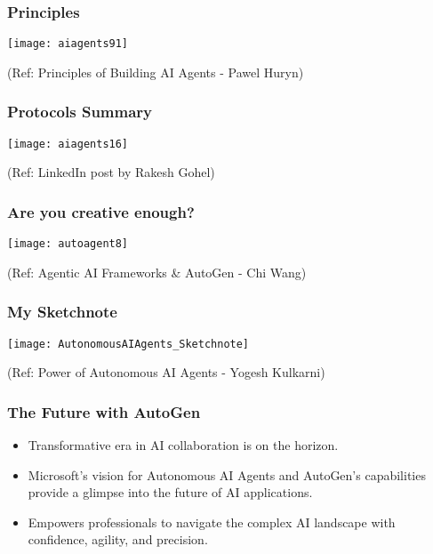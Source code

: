 \begin{frame}[fragile]\frametitle{Principles}
		\begin{center}
		\texttt{[image: aiagents91]}
		
		{\tiny (Ref: Principles of Building AI Agents - Pawel Huryn)}
		\end{center}
\end{frame}

\begin{frame}[fragile]\frametitle{Protocols Summary}
		\begin{center}
		\texttt{[image: aiagents16]}
		\end{center}
		
		{\tiny (Ref: LinkedIn post by Rakesh Gohel)}
\end{frame}
  

\begin{frame}[fragile]\frametitle{Are you creative enough?}
		\begin{center}
		\texttt{[image: autoagent8]}
		\end{center}
		
		{\tiny (Ref: Agentic AI Frameworks \& AutoGen - Chi Wang)}
\end{frame}
  

\begin{frame}[fragile]\frametitle{My Sketchnote}
	
	\begin{center}
	\texttt{[image: AutonomousAIAgents\_Sketchnote]}
	\end{center}
{\tiny (Ref: Power of Autonomous AI Agents - Yogesh Kulkarni)}
\end{frame}

\begin{frame}[fragile]\frametitle{The Future with AutoGen}
  \begin{itemize}
    \item Transformative era in AI collaboration is on the horizon.
    \item Microsoft's vision for Autonomous AI Agents and AutoGen's capabilities provide a glimpse into the future of AI applications.
    \item Empowers professionals to navigate the complex AI landscape with confidence, agility, and precision.
  \end{itemize}
\end{frame}


